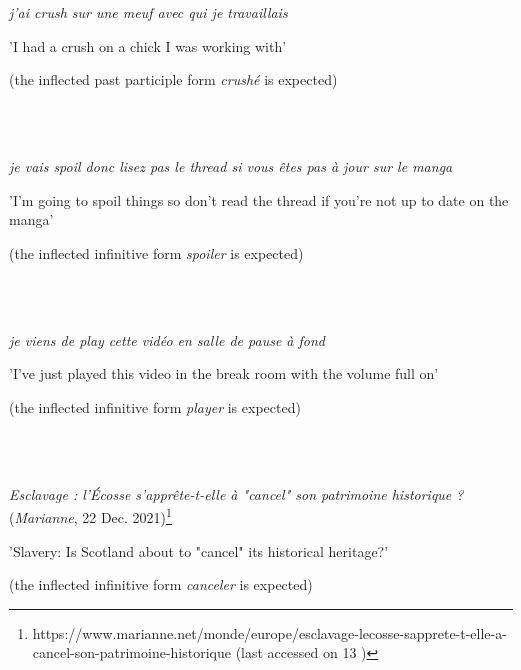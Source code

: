 \documentclass[output=paper]{langscibook}
\begin{document}
\ea%
    \label{ex:key:1}
    \gll \\
         \\
    \glt
    \z %

          \textit{j'ai crush sur une meuf avec qui je travaillais}

  {}'I had a crush on a chick I was working with'

  (the inflected past participle form \textit{crushé} is expected)

\ea%
    \label{ex:key:2}
    \gll \\
         \\
    \glt
    \z %

          \textit{je vais spoil donc lisez pas le thread si vous êtes pas à jour sur   le manga}

  {}'I'm going to spoil things so don't read the thread if you're not up   to date on the manga'

  (the inflected infinitive form \textit{spoiler} is expected)

\ea%
    \label{ex:key:3}
    \gll \\
         \\
    \glt
    \z %

          \textit{je viens de play cette vidéo en salle de pause à fond}

  {}'I've just played this video in the break room with the volume full   on'

  (the inflected infinitive form \textit{player} is expected)

\ea%
    \label{ex:key:4}
    \gll \\
         \\
    \glt
    \z %

          \textit{Esclavage : l'Écosse s'apprête-t-elle à "cancel" son patrimoine   historique ?} (\textit{Marianne}, 22 Dec. 2021)\footnote{https://www.marianne.net/monde/europe/esclavage-lecosse-sapprete-t-elle-a-cancel-son-patrimoine-historique (last accessed on 13 \citealt{June2024})}

  {}'Slavery: Is Scotland about to "cancel" its historical heritage?'

  (the inflected infinitive form \textit{canceler} is expected)
\end{document}
